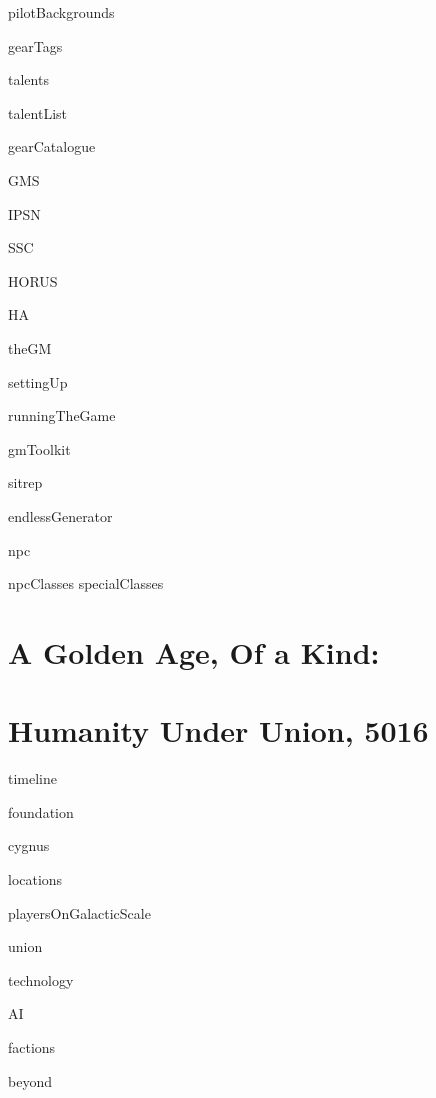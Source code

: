 \documentclass{article}
\begin{document}
{pilotBackgrounds}    
\newpage

{gearTags}    
\newpage

{talents}

{talentList}     
\newpage


{gearCatalogue}    
\newpage

{GMS}    
\newpage

{IPSN}    
\newpage

{SSC}    
\newpage

{HORUS}    
\newpage

{HA}    
\newpage

{theGM}    
\newpage

{settingUp}    
\newpage

{runningTheGame}    
\newpage

{gmToolkit}    
\newpage

{sitrep}    
\newpage

{endlessGenerator}    
\newpage

{npc}    
\newpage

{npcClasses}    
\newpage
{specialClasses}    
\newpage
\section{A Golden Age, Of a Kind:}  
\section{Humanity Under Union, 5016} 
\newpage

{timeline}    
\newpage

{foundation}    
\newpage

{cygnus}    
\newpage

{locations}    
\newpage

{playersOnGalacticScale}    
\newpage

{union}    
\newpage

{technology}    
\newpage

{AI}    
\newpage

{factions}    
\newpage

{beyond}    
\newpage
\end{document}
